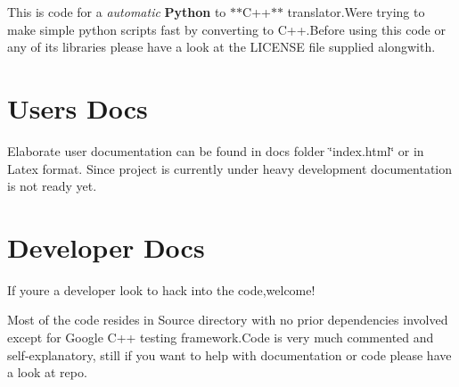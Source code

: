 This is code for a {\itshape automatic} {\bfseries Python} to $\ast$$\ast$\+C++$\ast$$\ast$ translator.\+We\textquotesingle{}re trying to make simple python scripts fast by converting to C++.Before using this code or any of its libraries please have a look at the L\+I\+C\+E\+N\+SE file supplied alongwith.

\section*{Users Docs }

Elaborate user documentation can be found in docs folder \char`\"{}index.\+html\char`\"{} or in Latex format. Since project is currently under heavy development documentation is not ready yet.

\section*{Developer Docs }

If you\textquotesingle{}re a developer look to hack into the code,welcome!

Most of the code resides in Source directory with no prior dependencies involved except for Google C++ testing framework.\+Code is very much commented and self-\/explanatory, still if you want to help with documentation or code please have a look at repo. 